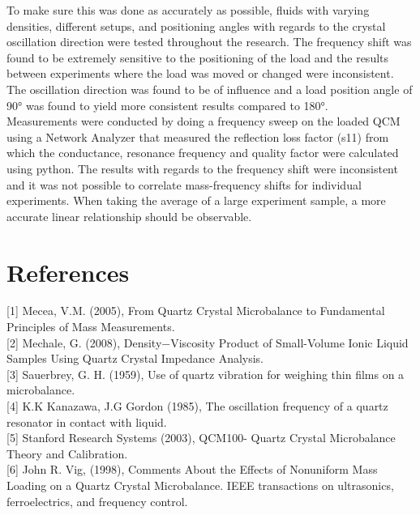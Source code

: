 \documentclass[a4paper, 10pt, conference]{ieeeconf}      %
\begin{document}
    To make sure this was done as accurately as possible, fluids with varying densities, different setups, and positioning angles with regards to the crystal oscillation direction were tested throughout the research.
    The frequency shift was found to be extremely sensitive to the positioning of the load and the results between experiments where the load was moved or changed were inconsistent.
    The oscillation direction was found to be of influence and a load position angle of 90° was found to yield more consistent results compared to 180°. \\

    Measurements were conducted by doing a frequency sweep on the loaded QCM using a Network Analyzer that measured the reflection loss factor (s11) from which the conductance, resonance frequency and quality factor were calculated using python.
    The results with regards to the frequency shift were inconsistent and it was not possible to correlate mass-frequency shifts for individual experiments.
    When taking the average of a large experiment sample, a more accurate linear relationship should be observable. \\



\section*{References}

[1]  Mecea, V.M. (2005), From Quartz Crystal Microbalance to Fundamental Principles of Mass Measurements. \\

[2] Mechale,  G. (2008), Density−Viscosity Product of Small-Volume Ionic Liquid Samples Using Quartz Crystal Impedance Analysis. \\

[3] Sauerbrey, G. H. (1959), Use of quartz vibration for weighing thin films on a microbalance. \\

[4] K.K Kanazawa, J.G Gordon (1985), The oscillation frequency of a quartz resonator in contact with liquid. \\

[5] Stanford Research Systems (2003), QCM100- Quartz Crystal Microbalance Theory and Calibration. \\

[6] John R. Vig, (1998), Comments About the Effects of Nonuniform Mass Loading on a Quartz Crystal Microbalance. IEEE transactions on ultrasonics, ferroelectrics, and frequency control. \\
\end{document}

